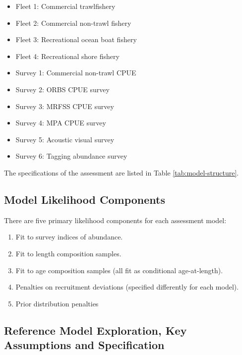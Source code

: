 \documentclass[11pt,
  english,
  letterpaper,
]{article}
\providecommand{\tightlist}{%
  \setlength{\itemsep}{0pt}\setlength{\parskip}{0pt}}
\providecommand{\tightlist}{%
  \setlength{\itemsep}{0pt}\setlength{\parskip}{0pt}}
\begin{document}
\begin{itemize}
\tightlist
\item
  Fleet 1: Commercial trawlfishery
\item
  Fleet 2: Commercial non-trawl fishery
\item
  Fleet 3: Recreational ocean boat fishery
\item
  Fleet 4: Recreational shore fishery
\item
  Survey 1: Commercial non-trawl CPUE\\
\item
  Survey 2: ORBS CPUE survey
\item
  Survey 3: MRFSS CPUE survey
\item
  Survey 4: MPA CPUE survey
\item
  Survey 5: Acoustic visual survey
\item
  Survey 6: Tagging abundance survey
\end{itemize}

The specifications of the assessment are listed in Table \ref{tab:model-structure}.

\hypertarget{model-likelihood-components}{%
\subsection{Model Likelihood Components}\label{model-likelihood-components}}

There are five primary likelihood components for each assessment model:

\begin{enumerate}
\def\labelenumi{\arabic{enumi}.}
\tightlist
\item
  Fit to survey indices of abundance.
\item
  Fit to length composition samples.
\item
  Fit to age composition samples (all fit as conditional age-at-length).\\
\item
  Penalties on recruitment deviations (specified differently for each model).
\item
  Prior distribution penalties
\end{enumerate}

\hypertarget{reference-model-exploration-key-assumptions-and-specification}{%
\subsection{Reference Model Exploration, Key Assumptions and Specification}\label{reference-model-exploration-key-assumptions-and-specification}}
\end{document}
